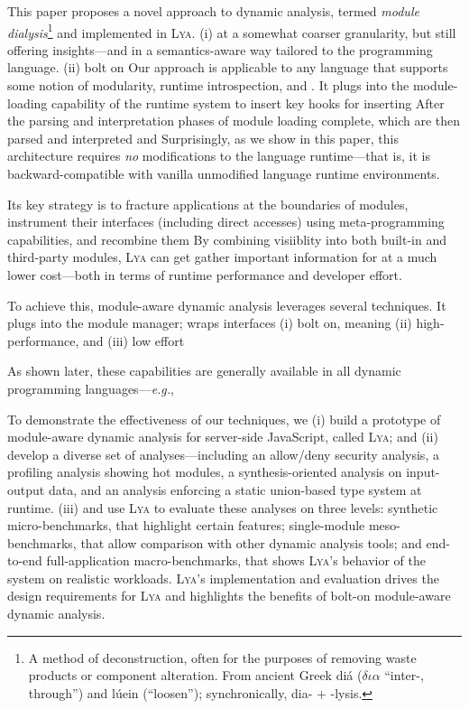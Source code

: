 \documentclass[letterpaper,twocolumn,10pt]{article}
\def\eg{{\em e.g.}, }
\newcommand{\sys}{{\scshape Lya}\xspace}
\begin{document}
This paper proposes a novel approach to dynamic analysis, termed \emph{module dialysis}\footnote{
  A method of deconstruction, often for the purposes of removing waste products or component alteration.
  From ancient Greek diá ($\delta\iota\alpha$ ``inter-, through'') and lúein (``loosen''); synchronically, dia- + -lysis.
} and implemented in \sys.
(i) at a somewhat coarser granularity, but still offering insights---and in a semantics-aware way tailored to the programming language.
(ii) bolt on
Our approach is applicable to any language that supports some notion of modularity, runtime introspection, and .
It plugs into the module-loading capability of the runtime system to insert key hooks for inserting 
After the parsing and interpretation phases of module loading complete, 
 which are then parsed and interpreted and 
Surprisingly, as we show in this paper, this architecture requires \emph{no} modifications to the language runtime---that is, it is backward-compatible with vanilla unmodified language runtime environments.

Its key strategy is to fracture applications at the boundaries of modules, instrument their interfaces (including direct accesses) using meta-programming capabilities, and recombine them 
By combining visiiblity into both built-in and third-party modules, \sys can get gather important information for 
at a much lower cost---both in terms of runtime performance and developer effort.

To achieve this, module-aware dynamic analysis leverages several techniques.
It plugs into the module manager;
wraps interfaces
(i) bolt on, meaning
(ii) high-performance, and 
(iii) low effort 

As shown later, these capabilities are generally available in all dynamic programming languages---\eg 

To demonstrate the effectiveness of our techniques, we
  (i) build a prototype of module-aware dynamic analysis for server-side JavaScript, called \sys; and
  (ii) develop a diverse set of analyses---including an allow/deny security analysis, a profiling analysis showing hot modules, a synthesis-oriented analysis on input-output data, and an analysis enforcing a static union-based type system at runtime.
  (iii)  and use \sys to evaluate these analyses on three levels:
    synthetic micro-benchmarks, that highlight certain features;
    single-module meso-benchmarks, that allow comparison with other dynamic analysis tools; and
    end-to-end full-application macro-benchmarks, that shows \sys's behavior of the system on realistic workloads. 
\sys's implementation and evaluation drives the design requirements for \sys and highlights the benefits of bolt-on module-aware dynamic analysis.
\end{document}
